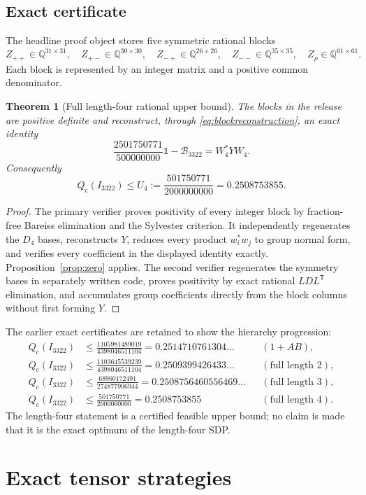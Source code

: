 \documentclass[11pt]{article}
\newtheorem{theorem}{Theorem}[section]
\newcommand{\1}{\mathbb{1}}
\newcommand{\Bop}{\mathcal{B}_{3322}}
\newcommand{\Qc}{Q_{\mathrm c}}
\newcommand{\Q}{\mathbb{Q}}
\begin{document}
\subsection{Exact certificate}
The headline proof object stores five symmetric rational blocks
\[
Z_{++}\in\Q^{31\times31},\quad Z_{+-}\in\Q^{30\times30},\quad
Z_{-+}\in\Q^{26\times26},\quad Z_{--}\in\Q^{35\times35},\quad
Z_\rho\in\Q^{61\times61}.
\]
Each block is represented by an integer matrix and a positive common denominator.

\begin{theorem}[Full length-four rational upper bound]\label{thm:u4}
The blocks in the release are positive definite and reconstruct, through \eqref{eq:blockreconstruction}, an exact identity
\[
\frac{2501750771}{500000000}\1-\Bop=W_4^*YW_4.
\]
Consequently
\[
\boxed{\Qc(I_{3322})\le U_4:=\frac{501750771}{2000000000}=0.2508753855.}
\]
\end{theorem}
\begin{proof}
The primary verifier proves positivity of every integer block by fraction-free Bareiss elimination and the Sylvester criterion.  It independently regenerates the $D_4$ bases, reconstructs $Y$, reduces every product $w_i^*w_j$ to group normal form, and verifies every coefficient in the displayed identity exactly.  Proposition~\ref{prop:zero} applies.  The second verifier regenerates the symmetry bases in separately written code, proves positivity by exact rational $LDL^{\mathsf T}$ elimination, and accumulates group coefficients directly from the block columns without first forming $Y$.
\end{proof}

The earlier exact certificates are retained to show the hierarchy progression:
\begin{align*}
\Qc(I_{3322})&\le\frac{1105981489019}{4398046511104}=0.2514710761304\ldots &&(1{+}AB),\\
\Qc(I_{3322})&\le\frac{1103645539239}{4398046511104}=0.2509399426433\ldots &&(\text{full length }2),\\
\Qc(I_{3322})&\le\frac{68960172491}{274877906944}=0.2508756460556469\ldots &&(\text{full length }3),\\
\Qc(I_{3322})&\le\frac{501750771}{2000000000}=0.2508753855 &&(\text{full length }4).
\end{align*}
The length-four statement is a certified feasible upper bound; no claim is made that it is the exact optimum of the length-four SDP.

\section{Exact tensor strategies}\label{sec:lower}
\end{document}
